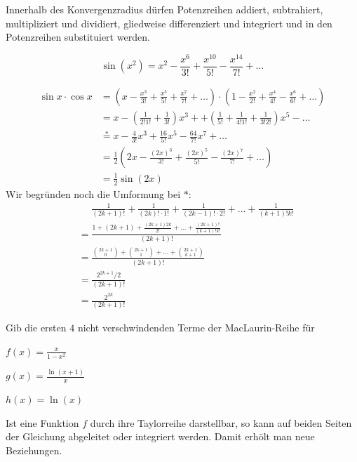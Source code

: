 \documentclass[%
11pt,%
twoside,%
titlepage,%
german,%
headsepline%
]{scrartcl}
\begin{document}
\begin{satz}
Innerhalb des Konvergenzradius d\"urfen Potenzreihen addiert, subtrahiert, multipliziert und dividiert, gliedweise differenziert und integriert und in den Potenzreihen substituiert werden.
\end{satz}

\begin{bsp}
$$\sin(x^2)=x^2-\frac{x^6}{3!}+\frac{x^{10}}{5!}-\frac{x^{14}}{7!}+\dots$$
\end{bsp}

\begin{bsp}
\begin{align*}
\sin x\cdot\cos x &= \left(x-\frac{x^3}{3!}+\frac{x^5}{5!}+\frac{x^7}{7!}+\dots\right)
\cdot\left(1-\frac{x^2}{2!}+\frac{x^4}{4!}-\frac{x^6}{6!}+\dots\right)\\
 &= x-\left(\frac{1}{2!1!}+\frac{1}{3!}\right)x^3+
 +\left(\frac{1}{5!}+\frac{1}{4!1!}+\frac{1}{3!2!}\right)x^5-\dots\\
 &\stackrel{*}{=}x-\frac{4}{3!}x^3+\frac{16}{5!}x^5-\frac{64}{7!}x^7+\dots\\
 &=\frac{1}{2}\left(2x-\frac{(2x)^3}{3!}+\frac{(2x)^5}{5!}-\frac{(2x)^7}{7!}+\dots\right)\\
 &=\frac{1}{2}\sin(2x)
\end{align*}
Wir begr\"unden noch die Umformung bei $*$:
\begin{align*}
&\phantom{=}\frac{1}{(2k+1)!}+\frac{1}{(2k)!\cdot1!}+\frac{1}{(2k-1)!\cdot2!}
+\dots+\frac{1}{(k+1)!k!}\\
&=\frac{1+(2k+1)+\frac{(2k+1)2k}{2!}+\dots+\frac{(2k+1)!}{(k+1)!k!}}{(2k+1)!}\\
&=\frac{\binom{2k+1}{0}+\binom{2k+1}{1}+\dots+\binom{2k+1}{k+1}}{(2k+1)!}\\
&=\frac{2^{2k+1}/2}{(2k+1)!}\\
&=\frac{2^{2k}}{(2k+1)!}
\end{align*}
\end{bsp}

\begin{ueb}
Gib die ersten $4$ nicht verschwindenden Terme der MacLaurin-Reihe f\"ur
\begin{enumeratea}
\item $f(x)=\frac{x}{1-x^2}$
\item $g(x)=\frac{\ln(x+1)}{x}$
\item $h(x)=\ln(x)$
\end{enumeratea}
\end{ueb}

Ist eine Funktion $f$ durch ihre Taylorreihe darstellbar, so kann auf beiden Seiten der Gleichung abgeleitet oder integriert werden. Damit erh\"olt man neue Beziehungen.
\end{document}
